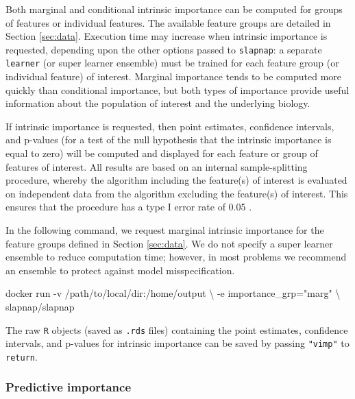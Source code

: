 \documentclass[]{article}
\newenvironment{Shaded}{\begin{snugshade}}{\end{snugshade}}
\newcommand{\StringTok}[1]{\textcolor[rgb]{0.31,0.60,0.02}{#1}}
\newcommand{\ExtensionTok}[1]{#1}
\newcommand{\NormalTok}[1]{#1}
\begin{document}
Both marginal and conditional intrinsic importance can be computed for
groups of features or individual features. The available feature groups
are detailed in Section \ref{sec:data}. Execution time may increase when
intrinsic importance is requested, depending upon the other options
passed to \texttt{slapnap}: a separate \texttt{learner} (or super
learner ensemble) must be trained for each feature group (or individual
feature) of interest. Marginal importance tends to be computed more
quickly than conditional importance, but both types of importance
provide useful information about the population of interest and the
underlying biology.

If intrinsic importance is requested, then point estimates, confidence
intervals, and p-values (for a test of the null hypothesis that the
intrinsic importance is equal to zero) will be computed and displayed
for each feature or group of features of interest. All results are based
on an internal sample-splitting procedure, whereby the algorithm
including the feature(s) of interest is evaluated on independent data
from the algorithm excluding the feature(s) of interest. This ensures
that the procedure has a type I error rate of 0.05
\citep{williamson2020}.

In the following command, we request marginal intrinsic importance for
the feature groups defined in Section \ref{sec:data}. We do not specify
a super learner ensemble to reduce computation time; however, in most
problems we recommend an ensemble to protect against model
misspecification.

\begin{Shaded}
\begin{Highlighting}[]
\ExtensionTok{docker}\NormalTok{ run -v /path/to/local/dir:/home/output \textbackslash{}}
\NormalTok{           -e importance_grp=}\StringTok{"marg"}\NormalTok{ \textbackslash{}}
\NormalTok{           slapnap/slapnap}
\end{Highlighting}
\end{Shaded}

The raw \texttt{R} objects (saved as \texttt{.rds} files) containing the
point estimates, confidence intervals, and p-values for intrinsic
importance can be saved by passing \texttt{"vimp"} to \texttt{return}.

\subsubsection{Predictive importance}\label{sec:predimp}
\end{document}
